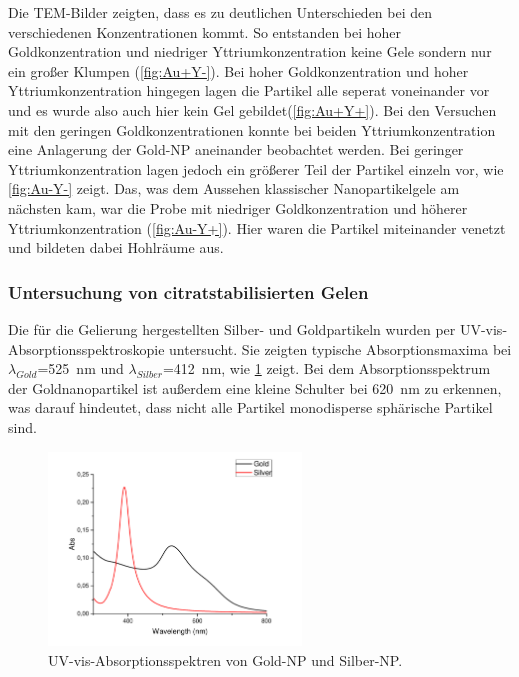		Die TEM-Bilder zeigten, dass es zu deutlichen Unterschieden bei den verschiedenen Konzentrationen kommt.
		So entstanden bei hoher Goldkonzentration und niedriger Yttriumkonzentration keine Gele sondern nur ein großer Klumpen (\cref{fig:Au+Y-}).
		Bei hoher Goldkonzentration und hoher Yttriumkonzentration hingegen lagen die Partikel alle seperat voneinander vor und es wurde also auch hier kein Gel gebildet(\cref{fig:Au+Y+}). 
		Bei den Versuchen mit den geringen Goldkonzentrationen konnte bei beiden Yttriumkonzentration eine Anlagerung der Gold-NP aneinander beobachtet werden.
		Bei geringer Yttriumkonzentration lagen jedoch ein größerer Teil der Partikel einzeln vor, wie \cref{fig:Au-Y-} zeigt. 
		Das, was dem Aussehen klassischer Nanopartikelgele am nächsten kam, war die Probe mit niedriger Goldkonzentration und höherer Yttriumkonzentration (\cref{fig:Au-Y+}). 
		Hier waren die Partikel miteinander venetzt und bildeten dabei Hohlräume aus.
		
		
	\subsubsection{Untersuchung von citratstabilisierten Gelen}
		
		Die für die Gelierung hergestellten Silber- und Goldpartikeln wurden per UV-vis-Absorptionsspektroskopie untersucht.
		Sie zeigten typische Absorptionsmaxima bei $\lambda_{Gold}$=\SI{525}{\nano\meter} und $\lambda_{Silber}$=\SI{412}{\nano\meter}, wie \cref{fig:Abs-cit} zeigt.
		Bei dem Absorptionsspektrum der Goldnanopartikel ist außerdem eine kleine Schulter bei \SI{620}{\nano\meter} zu erkennen, was darauf hindeutet, dass nicht alle Partikel monodisperse sphärische Partikel sind.  
		\begin{figure}[H]
			\centering
			\includegraphics[width=0.6\textwidth]{Bilder/Citrat-NP} 	
			\caption{UV-vis-Absorptionsspektren von Gold-NP und Silber-NP.}
			\label{fig:Abs-cit}
		\end{figure}
	

